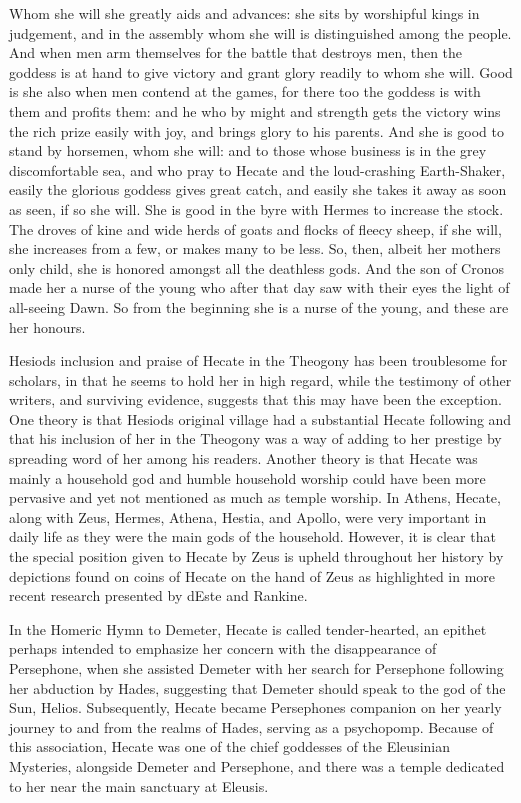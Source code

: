 \begin{tcolorbox}[breakable, colback=white, colframe=black!80,
  boxrule=0.6pt, arc=0mm, left=3mm, right=3mm, top=2mm, bottom=2mm]
Whom she will she greatly aids and advances: she sits by worshipful kings in judgement, and in the assembly whom she will is distinguished among the people. And when men arm themselves for the battle that destroys men, then the goddess is at hand to give victory and grant glory readily to whom she will. Good is she also when men contend at the games, for there too the goddess is with them and profits them: and he who by might and strength gets the victory wins the rich prize easily with joy, and brings glory to his parents. And she is good to stand by horsemen, whom she will: and to those whose business is in the grey discomfortable sea, and who pray to Hecate and the loud-{}crashing Earth-{}Shaker, easily the glorious goddess gives great catch, and easily she takes it away as soon as seen, if so she will. She is good in the byre with Hermes to increase the stock. The droves of kine and wide herds of goats and flocks of fleecy sheep, if she will, she increases from a few, or makes many to be less. So, then, albeit her mother\textquotesingle{}s only child, she is honored amongst all the deathless gods. And the son of Cronos made her a nurse of the young who after that day saw with their eyes the light of all-{}seeing Dawn. So from the beginning she is a nurse of the young, and these are her honours.\par
\medskip
Hesiod\textquotesingle{}s inclusion and praise of Hecate in the Theogony has been troublesome for scholars, in that he seems to hold her in high regard, while the testimony of other writers, and surviving evidence, suggests that this may have been the exception. One theory is that Hesiod\textquotesingle{}s original village had a substantial Hecate following and that his inclusion of her in the Theogony was a way of adding to her prestige by spreading word of her among his readers. Another theory is that Hecate was mainly a household god and humble household worship could have been more pervasive and yet not mentioned as much as temple worship. In Athens, Hecate, along with Zeus, Hermes, Athena, Hestia, and Apollo, were very important in daily life as they were the main gods of the household. However, it is clear that the special position given to Hecate by Zeus is upheld throughout her history by depictions found on coins of Hecate on the hand of Zeus as highlighted in more recent research presented by d\textquotesingle{}Este and Rankine.\par
\medskip
In the Homeric Hymn to Demeter, Hecate is called \textquotedbl{}tender-{}hearted\textquotedbl{}, an epithet perhaps intended to emphasize her concern with the disappearance of Persephone, when she assisted Demeter with her search for Persephone following her abduction by Hades, suggesting that Demeter should speak to the god of the Sun, Helios. Subsequently, Hecate became Persephone\textquotesingle{}s companion on her yearly journey to and from the realms of Hades, serving as a psychopomp. Because of this association, Hecate was one of the chief goddesses of the Eleusinian Mysteries, alongside Demeter and Persephone, and there was a temple dedicated to her near the main sanctuary at Eleusis.\par

\end{tcolorbox}
